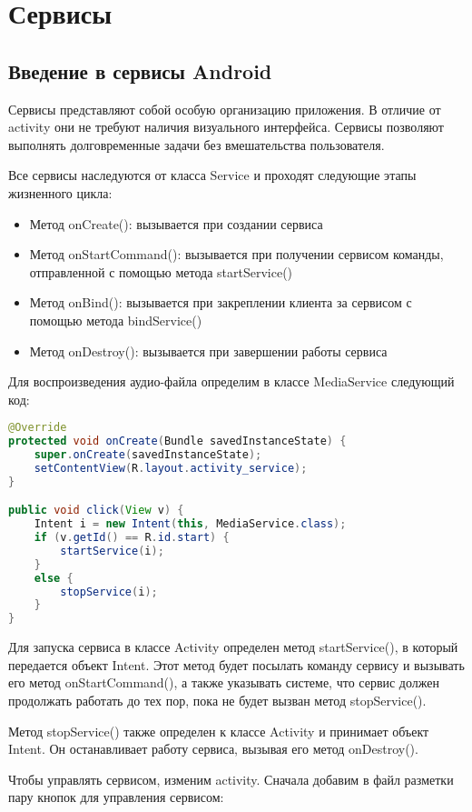 \section{Сервисы}
\subsection{Введение в сервисы Android}
Сервисы представляют собой особую организацию приложения. В отличие
от activity они не требуют наличия визуального интерфейса. Сервисы
позволяют выполнять долговременные задачи без вмешательства
пользователя.\par
Все сервисы наследуются от класса Service и проходят следующие этапы
жизненного цикла:
\begin{itemize}
	\item Метод onCreate(): вызывается при создании сервиса
	\item Метод onStartCommand(): вызывается при получении сервисом
		команды, отправленной с помощью метода startService()
	\item Метод onBind(): вызывается при закреплении клиента за сервисом с
		помощью метода bindService()
	\item Метод onDestroy(): вызывается при завершении работы сервиса
\end{itemize}

Для воспроизведения аудио-файла определим в классе MediaService
следующий код:

\begin{lstlisting}[language=Java
	, label=lst:
	]
@Override
protected void onCreate(Bundle savedInstanceState) {
	super.onCreate(savedInstanceState);
	setContentView(R.layout.activity_service);
}

public void click(View v) {
	Intent i = new Intent(this, MediaService.class);
	if (v.getId() == R.id.start) {
		startService(i);
	}
	else {
		stopService(i);
	}
}
\end{lstlisting}

Для запуска сервиса в классе Activity определен метод startService(), в
который передается объект Intent. Этот метод будет посылать команду
сервису и вызывать его метод onStartCommand(), а также указывать
системе, что сервис должен продолжать работать до тех пор, пока не будет
вызван метод stopService().\par
Метод stopService() также определен к классе Activity и принимает объект
Intent. Он останавливает работу сервиса, вызывая его метод onDestroy().\par
Чтобы управлять сервисом, изменим activity. Сначала добавим в файл
разметки пару кнопок для управления сервисом:

